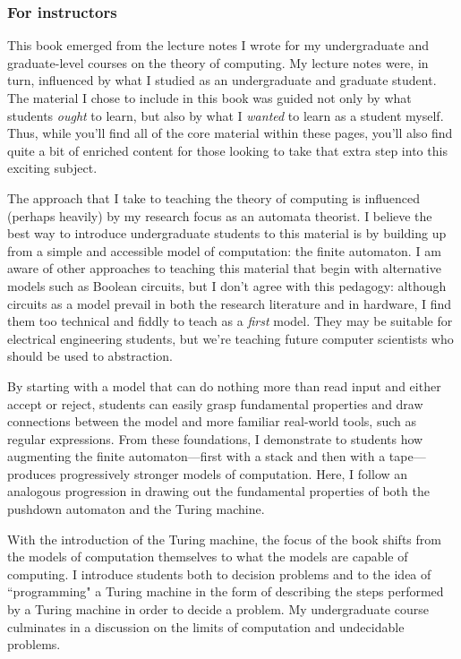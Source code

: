 \subsubsection*{For instructors}

This book emerged from the lecture notes I wrote for my undergraduate and graduate-level courses on the theory of computing. My lecture notes were, in turn, influenced by what I studied as an undergraduate and graduate student. The material I chose to include in this book was guided not only by what students \emph{ought} to learn, but also by what I \emph{wanted} to learn as a student myself. Thus, while you'll find all of the core material within these pages, you'll also find quite a bit of enriched content for those looking to take that extra step into this exciting subject.

The approach that I take to teaching the theory of computing is influenced (perhaps heavily) by my research focus as an automata theorist. I believe the best way to introduce undergraduate students to this material is by building up from a simple and accessible model of computation: the finite automaton. I am aware of other approaches to teaching this material that begin with alternative models such as Boolean circuits, but I don't agree with this pedagogy: although circuits as a model prevail in both the research literature and in hardware, I find them too technical and fiddly to teach as a \emph{first} model. They may be suitable for electrical engineering students, but we're teaching future computer scientists who should be used to abstraction.

By starting with a model that can do nothing more than read input and either accept or reject, students can easily grasp fundamental properties and draw connections between the model and more familiar real-world tools, such as regular expressions. From these foundations, I demonstrate to students how augmenting the finite automaton---first with a stack and then with a tape---produces progressively stronger models of computation. Here, I follow an analogous progression in drawing out the fundamental properties of both the pushdown automaton and the Turing machine.

With the introduction of the Turing machine, the focus of the book shifts from the models of computation themselves to what the models are capable of computing. I introduce students both to decision problems and to the idea of ``programming" a Turing machine in the form of describing the steps performed by a Turing machine in order to decide a problem. My undergraduate course culminates in a discussion on the limits of computation and undecidable problems.

